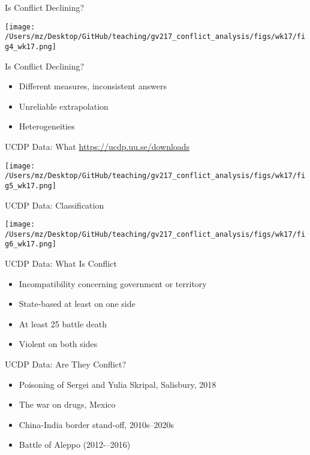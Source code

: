 \documentclass[handout]{beamer}
\begin{document}
\begin{frame}{Is Conflict Declining?}
    \pause
    \begin{center}
        \texttt{[image: /Users/mz/Desktop/GitHub/teaching/gv217\_conflict\_analysis/figs/wk17/fig4\_wk17.png]}
    \end{center}
\end{frame}

\begin{frame}{Is Conflict Declining?}
    \begin{itemize}
        \item Different measures, inconsistent answers
        \item Unreliable extrapolation
        \pause\item Heterogeneities
    \end{itemize}
\end{frame}

\begin{frame}{UCDP Data: What}
    \pause\url{https://ucdp.uu.se/downloads}
    \pause
    \begin{center}
        \texttt{[image: /Users/mz/Desktop/GitHub/teaching/gv217\_conflict\_analysis/figs/wk17/fig5\_wk17.png]}
    \end{center}
\end{frame}

\begin{frame}{UCDP Data: Classification}
    \pause
    \begin{center}
        \texttt{[image: /Users/mz/Desktop/GitHub/teaching/gv217\_conflict\_analysis/figs/wk17/fig6\_wk17.png]}
    \end{center}
\end{frame}

\begin{frame}{UCDP Data: What Is Conflict}
    \begin{itemize}
        \pause\item Incompatibility concerning government or territory
        \pause\item State-based at least on one side
        \pause\item At least 25 battle death
        \pause\item Violent on both sides
    \end{itemize}
\end{frame}

\begin{frame}{UCDP Data: Are They Conflict?}
    \begin{itemize}
        \pause\item Poisoning of Sergei and Yulia Skripal, Salisbury, 2018
        \pause\item The war on drugs, Mexico
        \pause\item China-India border stand-off, 2010s--2020s
        \pause\item Battle of Aleppo (2012-–2016)
    \end{itemize}
\end{frame}
\end{document}

